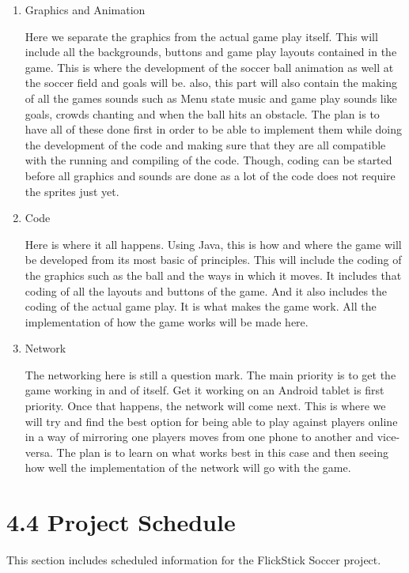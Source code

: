 \documentclass{article}
\begin{document}
\begin{enumerate}
\item Graphics and Animation

Here we separate the graphics from the actual game play itself. This will include all the backgrounds, buttons and game play layouts contained in the game. This is where the development of the soccer ball animation as well at the soccer field and goals will be. also, this part will also contain the making of all the games sounds such as Menu state music and game play sounds like goals, crowds chanting and when the ball hits an obstacle. The plan is to have all of these done first in order to be able to implement them while doing the development of the code and making sure that they are all compatible with the running and compiling of the code. Though, coding can be started before all graphics and sounds are done as a lot of the code does not require the sprites just yet.

\item Code

Here is where it all happens. Using Java, this is how and where the game will be developed from its most basic of principles. This will include the coding of the graphics such as the ball and the ways in which it moves. It includes that coding of all the layouts and buttons of the game. And it also includes the coding of the actual game play. It is what makes the game work. All the implementation of how the game works will be made here.
\item Network

The networking here is still a question mark. The main priority is to get the game working in and of itself. Get it working on an Android tablet is first priority. Once that happens, the network will come next. This is where we will try and find the best option for being able to play against players online in a way of mirroring one players moves from one phone to another and vice-versa. The plan is to learn on what works best in this case and then seeing how well the implementation of the network will go with the game.
\end{enumerate}

\section{4.4 Project Schedule}
This section includes scheduled information for the FlickStick Soccer project.
\end{document}

